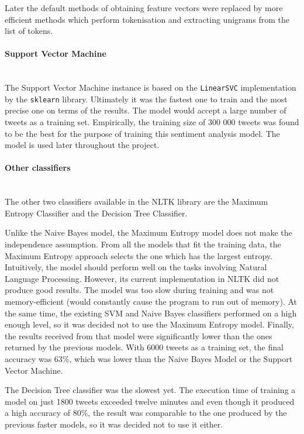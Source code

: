 Later the default methods of obtaining feature vectors were replaced by more efficient methods which perform tokenisation and extracting unigrams from the list of tokens.

\paragraph{Support Vector Machine}\mbox{}\\
The Support Vector Machine instance is based on the \texttt{LinearSVC} implementation by the \texttt{sklearn} library. 
Ultimately it was the fastest one to train and the most precise one on terms of the results. The model would accept a large number of tweets as a training set. Empirically, the training size of 300 000 tweets was found to be the best for the purpose of training this sentiment analysis model. The model is used later throughout the project.

\paragraph{Other classifiers}\mbox{}\\
The other two classifiers available in the NLTK library are the Maximum Entropy Classifier and the Decision Tree Classifier.

Unlike the Naive Bayes model, the Maximum Entropy model does not make the independence assumption. From all the models that fit the training data, the Maximum Entropy approach selects the one which has the largest entropy. Intuitively, the model should perform well on the tasks involving Natural Language Processing. However, its current implementation in NLTK did not produce good results. The model was too slow during training and was not memory-efficient (would constantly cause the program to run out of memory). At the same time, the existing SVM and Naive Bayes classifiers performed on a high enough level, so it was decided not to use the Maximum Entropy model. Finally, the results received from that model were significantly lower than the ones returned by the previous models. With 6000 tweets as a training set, the final accuracy was 63\%, which was lower than the Naive Bayes Model or the Support Vector Machine. 

The Decision Tree classifier was the slowest yet. The execution time of training a model on just 1800 tweets exceeded twelve minutes and even though it produced a high accuracy of 80\%, the result was comparable to the one produced by the previous faster models, so it was decided not to use it either.

